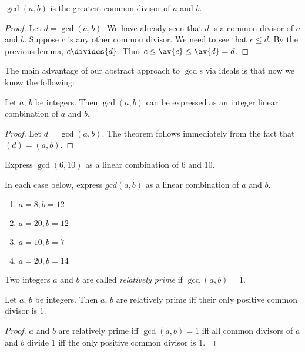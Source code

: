 \documentclass[oneside,12pt]{amsart}
\begin{document}
\begin{lemma}
$\gcd(a,b)$ is the greatest common divisor of $a$ and $b$.
\end{lemma}
\begin{proof}
Let $d=\gcd(a,b)$. We have already seen that $d$ is a common divisor of
$a$ and $b$. Suppose $c$ is any other common divisor. We need to see that
$c\leq d$. By the previous
lemma, $c\divides{d}$. Thus $c\leq\av{c}\leq\av{d}=d$.
\end{proof}

The main advantage of our abstract approach to $\gcd$s via ideals is that
now we know the following:

\begin{theorem}
Let $a$, $b$ be integers. Then $\gcd(a,b)$ can be expressed as an integer
linear combination of $a$ and $b$.
\end{theorem}
\begin{proof}
Let $d=\gcd(a,b)$. The theorem follows immediately from the fact that
$(d) = (a,b)$.
\end{proof}

\begin{in_class_example}
Express $\gcd(6,10)$ as a linear combination of $6$ and $10$.
\end{in_class_example}

\begin{homework}
In each case below, express $gcd(a,b)$ as a linear combination of $a$ and $b$.
\begin{enumerate}
\item $a = 8, b= 12$
\item $a = 20, b= 12$
\item $a=10, b=7$
\item $a=20, b=14$
\end{enumerate}
\end{homework}

\begin{definition}
Two integers $a$ and $b$ are called \emph{relatively prime} if
$\gcd(a,b) = 1$.
\end{definition}

\begin{lemma}
Let $a$, $b$ be integers. Then $a$, $b$ are relatively prime iff
their only positive common divisor is $1$.
\end{lemma}
\begin{proof} $a$ and $b$ are relatively prime iff
$\gcd(a,b)=1$ iff all common divisors of $a$ and $b$ divide 1
iff the only positive common divisor is 1.
\end{proof}
\end{document}
